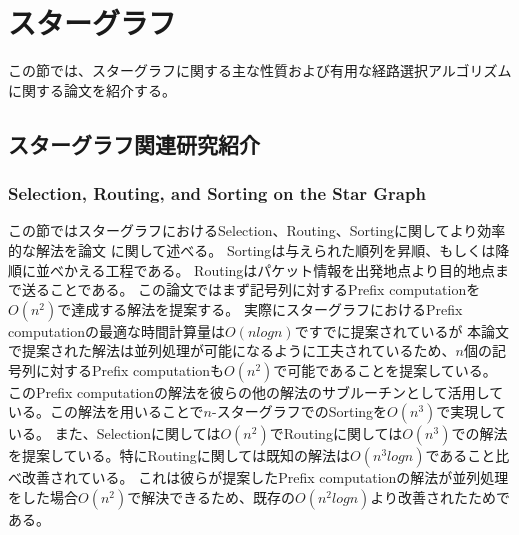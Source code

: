 \documentclass[11pt,a4j]{jsarticle}
\theoremstyle{plain}
\begin{document}
\newpage

%









\section{スターグラフ}
この節では、スターグラフに関する主な性質および有用な経路選択アルゴリズムに関する論文を紹介する。








\subsection{スターグラフ関連研究紹介}
\subsubsection{Selection, Routing, and Sorting on the Star Graph}
この節ではスターグラフにおけるSelection、Routing、Sortingに関してより効率的な解法を論文 \cite{star-routing}に関して述べる。\newline
Sortingは与えられた順列を昇順、もしくは降順に並べかえる工程である。\newline
Routingはパケット情報を出発地点より目的地点まで送ることである。\newline
この論文ではまず記号列に対するPrefix computationを$O(n^2)$で達成する解法を提案する。
実際にスターグラフにおけるPrefix computationの最適な時間計算量は$O(nlogn)$ですでに提案されている\cite{star-optimal-prefix-computation}が
本論文で提案された解法は並列処理が可能になるように工夫されているため、$n$個の記号列に対するPrefix computationも$O(n^2)$で可能であることを提案している。
このPrefix computationの解法を彼らの他の解法のサブルーチンとして活用している。この解法を用いることで$n$-スターグラフでのSortingを$O(n^3)$で実現している。
また、Selectionに関しては$O(n^2)$でRoutingに関しては$O(n^3)$での解法を提案している。特にRoutingに関しては既知の解法は$O(n^3logn)$であること比べ改善されている。
これは彼らが提案したPrefix computationの解法が並列処理をした場合$O(n^2)$で解決できるため、既存の$O(n^2logn)$より改善されたためである。
\end{document}
